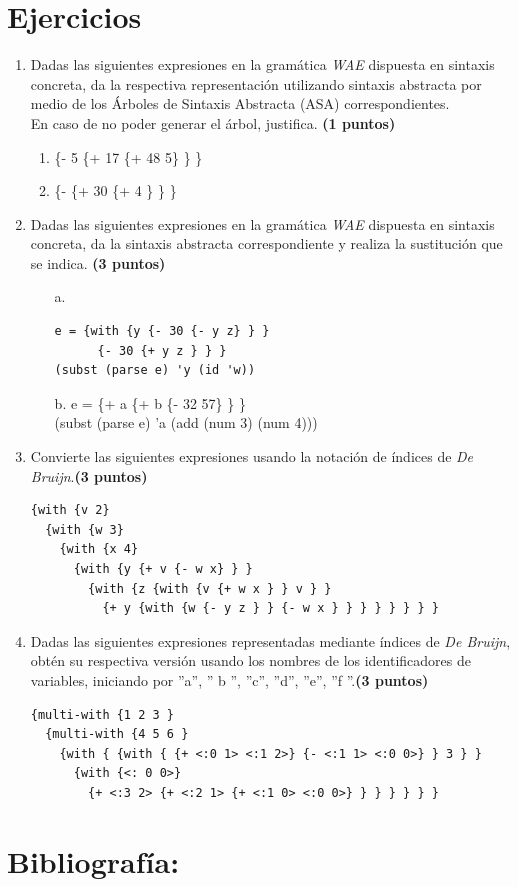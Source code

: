 \documentclass[11pt]{article}
\begin{document}
\section*{Ejercicios}

\begin{enumerate}[leftmargin=0.8cm]

    \item Dadas las siguientes expresiones en la gramática \textit{WAE} dispuesta en sintaxis concreta, da la respectiva representación utilizando sintaxis abstracta por medio de los Árboles de Sintaxis Abstracta (ASA) correspondientes.\\
    En caso de no poder generar el árbol, justifica. \textbf{(1 puntos)}
    \begin{enumerate}
        \item \{- 5 \{+ 17 \{+ 48 5\} \} \}
        \item \{- \{+ 30 \{+ 4 \} \} \}
    \end{enumerate}
    
    \item Dadas las siguientes expresiones en la gramática \textit{WAE} dispuesta en sintaxis concreta, da la sintaxis abstracta correspondiente y realiza la sustitución que se indica. \textbf{(3 puntos)}
    \begin{enumerate}
        \item[a.] \begin{lstlisting}
e = {with {y {- 30 {- y z} } }
      {- 30 {+ y z } } }
(subst (parse e) 'y (id 'w))
        \end{lstlisting}
        \item[b.] e = \{+ a \{+ b \{- 32 57\} \} \}\\
        (subst (parse e) 'a (add (num 3) (num 4)))
    \end{enumerate}

    \item Convierte las siguientes expresiones usando la notación de índices de \textit{De Bruijn}.\textbf{(3 puntos)}
    \begin{lstlisting}
{with {v 2}
  {with {w 3}
    {with {x 4}
      {with {y {+ v {- w x} } }
        {with {z {with {v {+ w x } } v } }
          {+ y {with {w {- y z } } {- w x } } } } } } } }
    \end{lstlisting}

    \item Dadas las siguientes expresiones representadas mediante índices de \textit{De Bruijn}, obtén su respectiva versión usando los nombres de los identificadores de variables, iniciando por ”a”, ” b ”, ”c”, ”d”, ”e”, ”f ”.\textbf{(3 puntos)}

    \begin{lstlisting}
{multi-with {1 2 3 }
  {multi-with {4 5 6 }
    {with { {with { {+ <:0 1> <:1 2>} {- <:1 1> <:0 0>} } 3 } }
      {with {<: 0 0>}
        {+ <:3 2> {+ <:2 1> {+ <:1 0> <:0 0>} } } } } } }
    \end{lstlisting}

\end{enumerate}

\section*{Bibliografía:}
 
\end{document}
